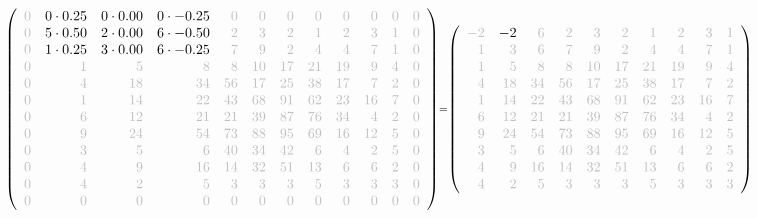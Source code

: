 \documentclass[11pt]{article}
\begin{document}
    
    \[\scriptstyle \def\g{\color{lightgray}}\left(\begin{array}{rrrrrrrrrrrr}\g{0} & 0\cdot 0.25 & 0\cdot 0.00 & 0\cdot -0.25 & \g{0} & \g{0} & \g{0} & \g{0} & \g{0} & \g{0} & \g{0} & \g{0}\\\g{0} & 5\cdot 0.50 & 2\cdot 0.00 & 6\cdot -0.50 & \g{2} & \g{3} & \g{2} & \g{1} & \g{2} & \g{3} & \g{1} & \g{0}\\\g{0} & 1\cdot 0.25 & 3\cdot 0.00 & 6\cdot -0.25 & \g{7} & \g{9} & \g{2} & \g{4} & \g{4} & \g{7} & \g{1} & \g{0}\\\g{0} & \g{1} & \g{5} & \g{8} & \g{8} & \g{10} & \g{17} & \g{21} & \g{19} & \g{9} & \g{4} & \g{0}\\\g{0} & \g{4} & \g{18} & \g{34} & \g{56} & \g{17} & \g{25} & \g{38} & \g{17} & \g{7} & \g{2} & \g{0}\\\g{0} & \g{1} & \g{14} & \g{22} & \g{43} & \g{68} & \g{91} & \g{62} & \g{23} & \g{16} & \g{7} & \g{0}\\\g{0} & \g{6} & \g{12} & \g{21} & \g{21} & \g{39} & \g{87} & \g{76} & \g{34} & \g{4} & \g{2} & \g{0}\\\g{0} & \g{9} & \g{24} & \g{54} & \g{73} & \g{88} & \g{95} & \g{69} & \g{16} & \g{12} & \g{5} & \g{0}\\\g{0} & \g{3} & \g{5} & \g{6} & \g{40} & \g{34} & \g{42} & \g{6} & \g{4} & \g{2} & \g{5} & \g{0}\\\g{0} & \g{4} & \g{9} & \g{16} & \g{14} & \g{32} & \g{51} & \g{13} & \g{6} & \g{6} & \g{2} & \g{0}\\\g{0} & \g{4} & \g{2} & \g{5} & \g{3} & \g{3} & \g{3} & \g{5} & \g{3} & \g{3} & \g{3} & \g{0}\\\g{0} & \g{0} & \g{0} & \g{0} & \g{0} & \g{0} & \g{0} & \g{0} & \g{0} & \g{0} & \g{0} & \g{0}\end{array}\right)=\left(\begin{array}{rrrrrrrrrrrr}\g{-2} & -2 & \g{6} & \g{2} & \g{3} & \g{2} & \g{1} & \g{2} & \g{3} & \g{1}\\\g{1} & \g{3} & \g{6} & \g{7} & \g{9} & \g{2} & \g{4} & \g{4} & \g{7} & \g{1}\\\g{1} & \g{5} & \g{8} & \g{8} & \g{10} & \g{17} & \g{21} & \g{19} & \g{9} & \g{4}\\\g{4} & \g{18} & \g{34} & \g{56} & \g{17} & \g{25} & \g{38} & \g{17} & \g{7} & \g{2}\\\g{1} & \g{14} & \g{22} & \g{43} & \g{68} & \g{91} & \g{62} & \g{23} & \g{16} & \g{7}\\\g{6} & \g{12} & \g{21} & \g{21} & \g{39} & \g{87} & \g{76} & \g{34} & \g{4} & \g{2}\\\g{9} & \g{24} & \g{54} & \g{73} & \g{88} & \g{95} & \g{69} & \g{16} & \g{12} & \g{5}\\\g{3} & \g{5} & \g{6} & \g{40} & \g{34} & \g{42} & \g{6} & \g{4} & \g{2} & \g{5}\\\g{4} & \g{9} & \g{16} & \g{14} & \g{32} & \g{51} & \g{13} & \g{6} & \g{6} & \g{2}\\\g{4} & \g{2} & \g{5} & \g{3} & \g{3} & \g{3} & \g{5} & \g{3} & \g{3} & \g{3}\end{array}\right)\]
\end{document}
